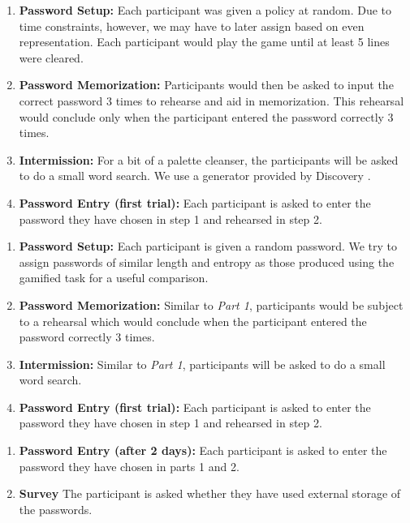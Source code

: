 \documentclass[conference]{IEEEtran}
\begin{document}
\begin{enumerate}
	\item \textbf{Password Setup:} Each participant was given a policy at random. Due to time constraints, however, we may have to later assign based on even representation. Each participant would play the game until at least 5 lines were cleared. 
	\item \textbf{Password Memorization:} Participants would then be asked to input the correct password 3 times to rehearse and aid in memorization. This rehearsal would conclude only when the participant entered the password correctly 3 times. 
	\item \textbf{Intermission:} For a bit of a palette cleanser, the participants will be asked to do a small word search. We use a generator provided by Discovery \cite{report:wordsearch}.
	\item \textbf{Password Entry (first trial):} Each participant is asked to enter the password they have chosen in step 1 and rehearsed in step 2. 
\end{enumerate}

\begin{enumerate}
	\item \textbf{Password Setup:} Each participant is given a random password. We try to assign passwords of similar length and entropy as those produced using the gamified task for a useful comparison.
	\item \textbf{Password Memorization:} Similar to \emph{Part 1}, participants would be subject to a rehearsal which would conclude when the participant entered the password correctly 3 times. 
	\item \textbf{Intermission:} Similar to \emph{Part 1}, participants will be asked to do a small word search. 
	\item \textbf{Password Entry (first trial):} Each participant is asked to enter the password they have chosen in step 1 and rehearsed in step 2. 
\end{enumerate}

\begin{enumerate}
	\item \textbf{Password Entry (after 2 days):} Each participant is asked to enter the password they have chosen in parts 1 and 2.
	\item \textbf{Survey} The participant is asked whether they have used external storage of the passwords.  
\end{enumerate}
\end{document}
